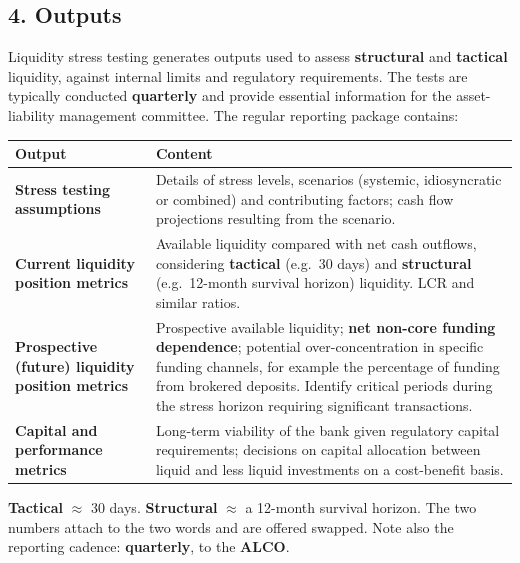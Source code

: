 \subsection{4. Outputs}

Liquidity stress testing generates outputs used to assess \textbf{structural} and \textbf{tactical} liquidity, against internal limits and regulatory requirements. The tests are typically conducted \textbf{quarterly} and provide essential information for the asset-liability management committee. The regular reporting package contains:

\begin{center}
\small
\begin{tabularx}{\textwidth}{@{}p{4.2cm} X@{}}
\toprule
\rowcolor{FRMSoft}\textbf{Output} & \textbf{Content} \\
\midrule
\textbf{Stress testing assumptions} & Details of stress levels, scenarios (systemic, idiosyncratic or combined) and contributing factors; cash flow projections resulting from the scenario. \\
\addlinespace
\textbf{Current liquidity position metrics} & Available liquidity compared with net cash outflows, considering \textbf{tactical} (e.g.\ 30 days) and \textbf{structural} (e.g.\ 12-month survival horizon) liquidity. LCR and similar ratios. \\
\addlinespace
\textbf{Prospective (future) liquidity position metrics} & Prospective available liquidity; \textbf{net non-core funding dependence}; potential over-concentration in specific funding channels, for example the percentage of funding from brokered deposits. Identify critical periods during the stress horizon requiring significant transactions. \\
\addlinespace
\textbf{Capital and performance metrics} & Long-term viability of the bank given regulatory capital requirements; decisions on capital allocation between liquid and less liquid investments on a cost-benefit basis. \\
\bottomrule
\end{tabularx}
\end{center}

\begin{lrtrapbox}
\textbf{Tactical} $\approx$ 30 days. \textbf{Structural} $\approx$ a 12-month survival horizon. The two numbers attach to the two words and are offered swapped. Note also the reporting cadence: \textbf{quarterly}, to the \textbf{ALCO}.
\end{lrtrapbox}

